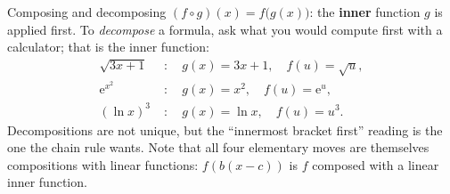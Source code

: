 \begin{gallery}
\hfill
{}\hfill
{}
\end{gallery}

\begin{rulebox}{Composing and decomposing}
$(f\circ g)(x)=f\bigl(g(x)\bigr)$: the \textbf{inner} function $g$ is
applied first. To \emph{decompose} a formula, ask what you would compute
first with a calculator; that is the inner function:
\[
  \begin{aligned}
    \sqrt{3x+1}\;&:\quad g(x)=3x+1, \quad f(u)=\sqrt{u},\\
    \mathrm{e}^{x^{2}}\;&:\quad g(x)=x^{2}, \quad f(u)=\mathrm{e}^{u},\\
    (\ln x)^{3}\;&:\quad g(x)=\ln x, \quad f(u)=u^{3}.
  \end{aligned}
\]
Decompositions are not unique, but the ``innermost bracket first'' reading
is the one the chain rule wants. Note that all four elementary moves are
themselves compositions with linear functions: $f(b(x-c))$ is $f$ composed
with a linear inner function.
\end{rulebox}


